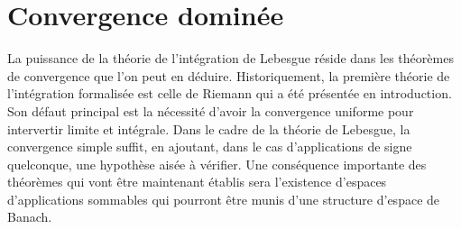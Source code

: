 \chapter{Convergence dominée}
La puissance de la théorie de l'intégration de Lebesgue réside dans
les théorèmes de convergence que l'on peut en déduire. Historiquement,
la première théorie de l'intégration formalisée est celle de Riemann qui a été
présentée en introduction. Son défaut principal est la nécessité d'avoir
 la convergence uniforme pour intervertir limite et intégrale. Dans le cadre de
 la théorie de Lebesgue, la convergence simple suffit, en ajoutant, dans le cas
 d'applications de signe quelconque, une hypothèse aisée à vérifier. Une conséquence
importante des théorèmes qui vont être maintenant établis sera l'existence
d'espaces d'applications sommables qui pourront être munis d'une structure
d'espace de Banach.

